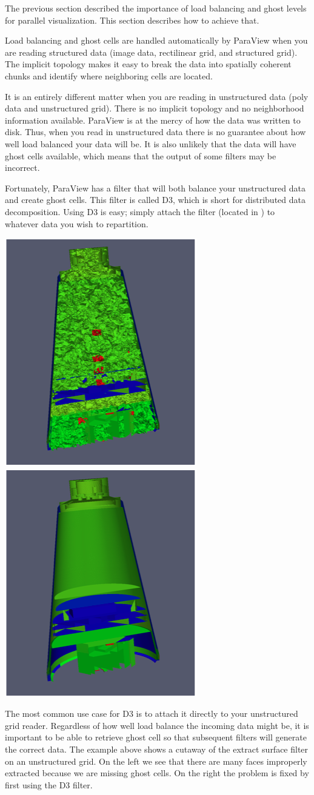 The previous section described the importance of load balancing and ghost
levels for parallel visualization.  This section describes how to achieve
that.

Load balancing and ghost cells are handled automatically by ParaView when
you are reading structured data (image data, rectilinear grid, and
structured grid).  The implicit topology makes it easy to break the data
into spatially coherent chunks and identify where neighboring cells are
located.

It is an entirely different matter when you are reading in unstructured
data (poly data and unstructured grid).  There is no implicit topology and
no neighborhood information available.  ParaView is at the mercy of how the
data was written to disk.  Thus, when you read in unstructured data there
is no guarantee about how well load balanced your data will be.  It is also
unlikely that the data will have ghost cells available, which means that
the output of some filters may be incorrect.

Fortunately, ParaView has a filter that will both balance your unstructured
data and create ghost cells.  This filter is called D3, which is short for
distributed data decomposition.  Using D3 is easy; simply attach the filter
(located in  \ra {} \ra {}) to whatever
data you wish to repartition.

\begin{inlinefig}
  \includegraphics[height=.3\linewidth]{images/D3ExampleBefore}
  \includegraphics[height=.3\linewidth]{images/D3ExampleAfter}
\end{inlinefig}

The most common use case for D3 is to attach it directly to your
unstructured grid reader.  Regardless of how well load balance the incoming
data might be, it is important to be able to retrieve ghost cell so that
subsequent filters will generate the correct data.  The example above shows
a cutaway of the extract surface filter on an unstructured grid.  On the
left we see that there are many faces improperly extracted because we are
missing ghost cells.  On the right the problem is fixed by first using the
D3 filter.


